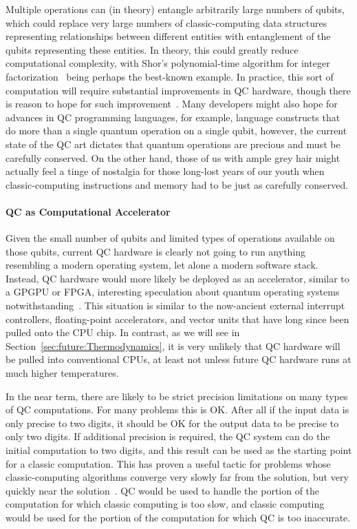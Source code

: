 Multiple  operations can (in theory) entangle arbitrarily
large numbers of qubits, which could replace very large numbers of
classic-computing data structures representing relationships between
different entities with entanglement of the qubits
representing these entities.
In theory, this could greatly reduce computational complexity, with
Shor's polynomial-time algorithm for integer
factorization~\cite{Shor:1997:PAP:264393.264406}
being perhaps the best-known example.
In practice, this sort of computation will require substantial
improvements in QC hardware, though there is reason to hope
for such improvement~\cite{RobertMcConnell2015QC-Entangle3000Atoms}.
Many developers might also hope for advances in QC programming languages,
for example, language constructs that do more than a single quantum
operation on a single qubit, however, the current state of the
QC art dictates that quantum operations are precious and must
be carefully conserved.
On the other hand, those of us with ample grey hair might actually
feel a tinge of nostalgia for those long-lost years of our youth when
classic-computing instructions and memory had to be just as carefully
conserved.

\paragraph{QC as Computational Accelerator}

Given the small number of qubits and limited types of operations available
on those qubits, current QC hardware is clearly not going to run anything
resembling a modern operating system, let alone a modern software stack.
Instead, QC hardware would more likely be deployed as an accelerator,
similar to a GPGPU or FPGA,
interesting speculation about quantum operating systems
notwithstanding~\cite{HenryCorriganGibbs2017QCOS}.
This situation is similar to the now-ancient external interrupt
controllers, floating-point accelerators, and vector units that have
long since been pulled onto the CPU chip.
In contrast, as we will see in Section~\ref{sec:future:Thermodynamics}, 
it is very unlikely that QC hardware will be pulled into conventional
CPUs, at least not unless future QC hardware runs at much higher
temperatures.

In the near term, there are likely to be strict precision limitations
on many types of QC computations.
For many problems this is OK.
After all if the input data is only precise to two digits, it should
be OK for the output data to be precise to only two digits.
If additional precision is required, the QC system can do the
initial computation to two digits, and this result can be used
as the starting point for a classic computation.
This has proven a useful tactic for problems whose classic-computing
algorithms converge very slowly far from the solution, but very
quickly near the solution~\cite{JakubKurzak2007MixedPrecision}.
QC would be used to handle the portion of the computation for which
classic computing is too slow, and classic computing would be used
for the portion of the computation for which QC is too inaccurate.

